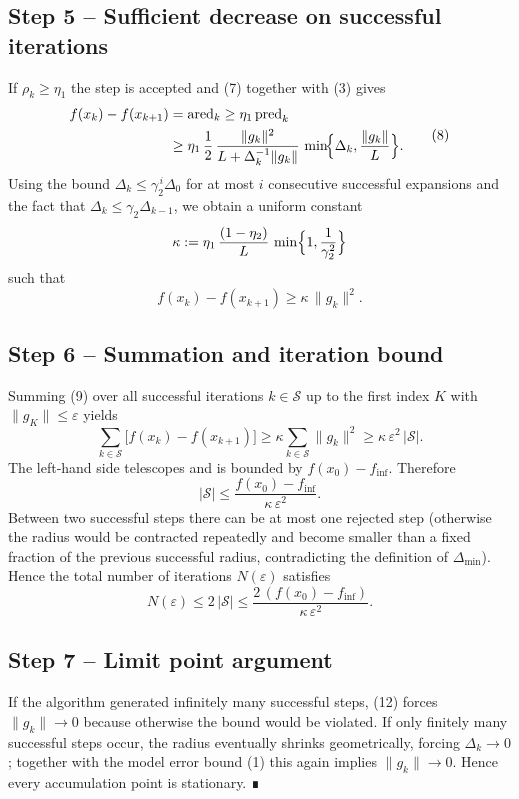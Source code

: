 \documentclass[11pt]{article}
\begin{document}
\subsection*{Step 5 – Sufficient decrease on successful iterations}
If $\rho_{k}\ge\eta_{1}$ the step is accepted and (7) together with (3) gives
\[
\begin{aligned}
f(x_{k})-f(x_{k+1})
&= \text{ared}_{k}
\ge \eta_{1}\,\text{pred}_{k}\\
&\ge \eta_{1}\,\frac{1}{2}\,\frac{\|g_{k}\|^{2}}{L+\Delta_{k}^{-1}\|g_{k}\|}\,
\min\!\Bigl\{\Delta_{k},\frac{\|g_{k}\|}{L}\Bigr\}.
\end{aligned}
\tag{8}
\]
Using the bound $\Delta_{k}\le\gamma_{2}^{\,i}\Delta_{0}$ for at most $i$ consecutive successful expansions and the fact that $\Delta_{k}\le\gamma_{2}\Delta_{k-1}$, we obtain a uniform constant
\[
\kappa:=\eta_{1}\,\frac{(1-\eta_{2})}{L}\,\min\Bigl\{1,\frac{1}{\gamma_{2}^{2}}\Bigr\}
\]
such that
\[
f(x_{k})-f(x_{k+1})\ge \kappa\,\|g_{k}\|^{2}.
\tag{9}
\]

\subsection*{Step 6 – Summation and iteration bound}
Summing (9) over all successful iterations $k\in\mathcal{S}$ up to the first index $K$ with $\|g_{K}\|\le\varepsilon$ yields
\[
\sum_{k\in\mathcal{S}} \bigl[f(x_{k})-f(x_{k+1})\bigr]
\ge \kappa\sum_{k\in\mathcal{S}}\|g_{k}\|^{2}
\ge \kappa\,\varepsilon^{2}\,|\mathcal{S}|.
\tag{10}
\]
The left‑hand side telescopes and is bounded by $f(x_{0})-f_{\inf}$.  Therefore
\[
|\mathcal{S}|\le \frac{f(x_{0})-f_{\inf}}{\kappa\,\varepsilon^{2}}.
\tag{11}
\]
Between two successful steps there can be at most one rejected step (otherwise the radius would be contracted repeatedly and become smaller than a fixed fraction of the previous successful radius, contradicting the definition of $\Delta_{\min}$).  Hence the total number of iterations $N(\varepsilon)$ satisfies
\[
N(\varepsilon)\le 2\,|\mathcal{S}|
\le \frac{2\,(f(x_{0})-f_{\inf})}{\kappa\,\varepsilon^{2}} .
\tag{12}
\]

\subsection*{Step 7 – Limit point argument}
If the algorithm generated infinitely many successful steps, (12) forces $\|g_{k}\|\to0$ because otherwise the bound would be violated.  If only finitely many successful steps occur, the radius eventually shrinks geometrically, forcing $\Delta_{k}\to0$; together with the model error bound (1) this again implies $\|g_{k}\|\to0$.  Hence every accumulation point is stationary. ∎
\end{document}
